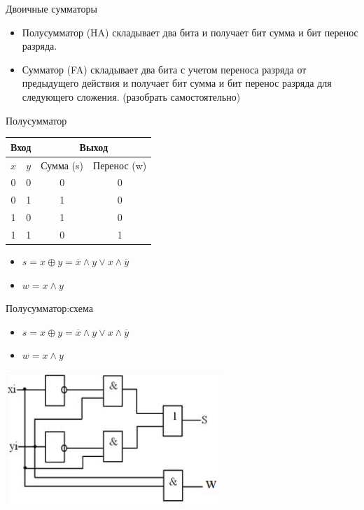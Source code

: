 \begin{frame}{Двоичные сумматоры}
\begin{itemize}
	\item \alert{Полусумматор} (HA) складывает два бита и получает бит \alert{сумма} и бит \alert{перенос} разряда.
	\item \alert{Сумматор} (FA) складывает два бита с учетом переноса разряда от предыдущего действия и получает бит \alert{сумма} и бит  \alert{перенос} разряда для следующего сложения. (разобрать самостоятельно)
\end{itemize}
\end{frame}


\begin{frame}{Полусумматор}
\begin{center}
\begin{tabular}{|c|c|c|c|}
	\hline
	\multicolumn{2}{|c|}{Вход} & \multicolumn{2}{c|}{Выход} \\
	\hline
	$x$ & $y$ & Сумма (s) & Перенос  (w) \\
	\hline\hline
	0   & 0   & 0   & 0     \\
	0   & 1   & 1   & 0     \\
	1   & 0   & 1   & 0     \\
	1   & 1   & 0   & 1     \\
	\hline
\end{tabular}
\end{center}
\pause
\begin{itemize}
	\item $s = x \oplus y=\overline{x}\wedge y \vee x\wedge \overline{y}$
	\item $w = x \wedge y$
\end{itemize}
\end{frame}

\begin{frame}{Полусумматор:схема}

\begin{itemize}
	\item $s = x \oplus y=\overline{x}\wedge y \vee x\wedge \overline{y}$
	\item $w = x \wedge y$
\end{itemize}

\includegraphics[height=5cm]{images/hs}
\end{frame}